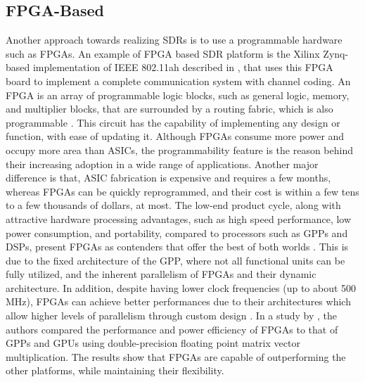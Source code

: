 \subsection{FPGA-Based}

Another approach towards realizing SDRs is to use a programmable hardware such as FPGAs. An example of FPGA based SDR platform is the Xilinx Zynq-based implementation of IEEE 802.11ah described in \cite{80211ah_for_iot}, that uses this FPGA board to implement a complete communication system with channel coding. An FPGA is an array of programmable logic blocks, such as general logic, memory, and multiplier blocks, that are surrounded by a routing fabric, which is also programmable \cite{kuon2008a}. This circuit has the capability of implementing any design or function, with ease of updating it. Although FPGAs consume more power and occupy more area than ASICs, the programmability feature is the reason behind their increasing adoption in a wide range of applications. Another major difference is that, ASIC fabrication is expensive and requires a few months, whereas FPGAs can be quickly reprogrammed, and their cost is within a few tens to a few thousands of dollars, at most. The low-end product cycle, along with attractive hardware processing advantages, such as high speed performance, low power consumption, and portability, compared to processors such as GPPs and DSPs, present FPGAs as contenders that offer the best of both worlds \cite{kuon2008a}. This is due to the fixed architecture of the GPP, where not all functional units can be fully utilized, and the inherent parallelism of FPGAs and their dynamic architecture. In addition, despite having lower clock frequencies (up to about 500 MHz), FPGAs can achieve better performances due to their architectures which allow higher levels of parallelism through custom design \cite{sano2017a}. In a study by \cite{kestur2010a}, the authors compared the performance and power efficiency of FPGAs to that of GPPs and GPUs using double-precision floating point matrix vector multiplication. The results show that FPGAs are capable of outperforming the other platforms, while maintaining their flexibility.

